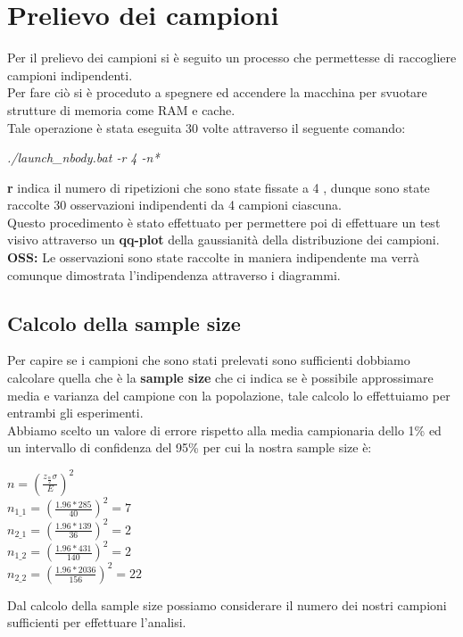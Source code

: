\section{Prelievo dei campioni}
Per il prelievo dei campioni si è seguito un processo che permettesse di raccogliere campioni indipendenti.\\
Per fare ciò si è proceduto a spegnere ed accendere la macchina per svuotare strutture di memoria come RAM e cache.\\
Tale operazione è stata eseguita 30 volte attraverso il seguente comando:
\begin{center}
    \textit{./launch\_nbody.bat -r 4 -n*}
\end{center}
\textbf{r} indica il numero di ripetizioni che sono state fissate a 4 , dunque sono state raccolte 30 osservazioni indipendenti da 4 campioni ciascuna.\\
Questo procedimento è stato effettuato per permettere poi di effettuare un test visivo attraverso un \textbf{qq-plot} della gaussianità della distribuzione dei campioni.\\
\textbf{OSS: }Le osservazioni sono state raccolte in maniera indipendente ma verrà comunque dimostrata l'indipendenza attraverso i diagrammi.\\
\subsection{Calcolo della sample size}
Per capire se i campioni che sono stati prelevati sono sufficienti dobbiamo calcolare quella che è la \textbf{sample size} che ci indica se è possibile approssimare media e varianza del campione con la popolazione, tale calcolo lo effettuiamo per entrambi gli esperimenti.\\
Abbiamo scelto un valore di errore rispetto alla media campionaria dello 1\% ed un intervallo di confidenza del 95\% per cui la nostra sample size è:\\
\begin{center}
    
        $n = (\frac{z_{\frac{\alpha}{2}} \sigma}{E})^2$ \\
        $n_{1\_1} = (\frac{1.96*285}{40})^2 = 7$ \\
        $n_{2\_1} = (\frac{1.96*139}{36})^2 = 2$ \\
        $n_{1\_2} = (\frac{1.96*431}{140})^2 = 2$ \\
        $n_{2\_2} = (\frac{1.96*2036}{156})^2 = 22$ \\
    
\end{center}
Dal calcolo della sample size possiamo considerare il numero dei nostri campioni sufficienti per effettuare l'analisi.\\
